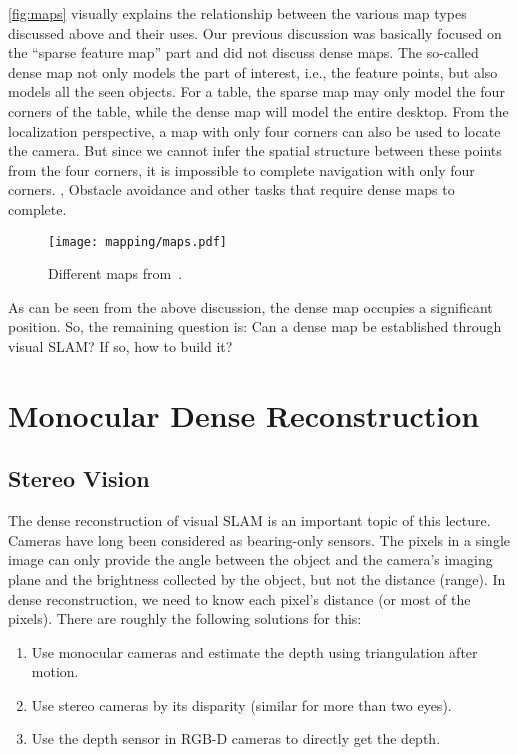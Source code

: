 \autoref{fig:maps} visually explains the relationship between the various map types discussed above and their uses. Our previous discussion was basically focused on the ``sparse feature map'' part and did not discuss dense maps. The so-called dense map not only models the part of interest, i.e., the feature points, but also models all the seen objects. For a table, the sparse map may only model the four corners of the table, while the dense map will model the entire desktop. From the localization perspective, a map with only four corners can also be used to locate the camera. But since we cannot infer the spatial structure between these points from the four corners, it is impossible to complete navigation with only four corners. , Obstacle avoidance and other tasks that require dense maps to complete.

\begin{figure}[!ht]
	\centering
	\texttt{[image: mapping/maps.pdf]}
	\caption{Different maps from~\cite{Mur-Artal2015, Labbe2014, Salas-Moreno2013}.}
	\label{fig:maps}
\end{figure}

As can be seen from the above discussion, the dense map occupies a significant position. So, the remaining question is: Can a dense map be established through visual SLAM? If so, how to build it?

\section{Monocular Dense Reconstruction}
\subsection{Stereo Vision}
The dense reconstruction of visual SLAM is an important topic of this lecture. Cameras have long been considered as bearing-only sensors. The pixels in a single image can only provide the angle between the object and the camera's imaging plane and the brightness collected by the object, but not the distance (range). In dense reconstruction, we need to know each pixel's distance (or most of the pixels). There are roughly the following solutions for this:
\begin{enumerate}
	\item Use monocular cameras and estimate the depth using triangulation after motion. 
	\item Use stereo cameras by its disparity (similar for more than two eyes). 
	\item Use the depth sensor in RGB-D cameras to directly get the depth. 
\end{enumerate}

